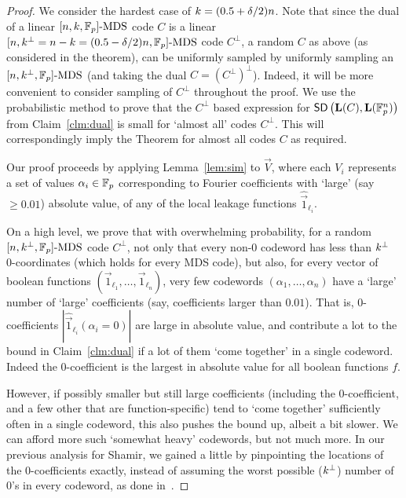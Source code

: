 \begin{proof}
We consider the hardest case of $k=(0.5 + \delta/2)n$. 
Note that since the dual of a linear $[n,k,\mathbb{F}_p]\text{-MDS}$ code $C$ is a linear $[n,k^\bot = n-k=(0.5-\delta/2)n,\mathbb{F}_p]\text{-MDS}$ code $C^\bot$, a random $C$ as above (as considered in the theorem), can be uniformly sampled by uniformly sampling an $[n,k^\bot,\mathbb{F}_p]\text{-MDS}$ (and taking the dual $C=(C^\bot)^\bot$).
Indeed, it will be more convenient to consider sampling of $C^\bot$ throughout the proof. 
We use the probabilistic method to prove that the $C^\bot$ based expression for $\mathsf{SD} \left({\mathbf{L}(C)},{\mathbf{L}(\mathbb{F}^n_p)} \right)$ from Claim~\ref{clm:dual} is small for `almost all' codes $C^\bot$. This will correspondingly imply the Theorem for almost all codes $C$ as required. 

Our proof proceeds by applying Lemma~\ref{lem:sim} to $\vec{V}$, where each $V_i$ represents a set of values $\alpha_i\in \mathbb{F}_p$ corresponding to Fourier coefficients with  `large' (say $\geq 0.01$) absolute value, of any of the local leakage functions $\widehat{\vec{1}}_{\ell_i}$. 

On a high level, we prove that with overwhelming probability, for a random $[n,k^\bot,\mathbb{F}_p]\text{-MDS}$ code $C^\bot$, not only that every non-0 codeword has less than $k^\bot$ 0-coordinates (which holds for every MDS code), but also, for every vector of boolean functions $(\vec{1}_{\ell_1},\ldots,\vec{1}_{\ell_n})$, very few codewords $(\alpha_1,\ldots,\alpha_n)$ have a `large' number of `large' coefficients (say, coefficients larger than $0.01$).
That is, 0-coefficients $|\widehat{\vec{1}}_{\ell_i}(\alpha_i=0)|$ are large in absolute value, and contribute a lot to the bound in Claim~\ref{clm:dual} if a lot of them `come together' in a single codeword. Indeed the 0-coefficient is the largest in absolute value for all boolean functions $f$. 

However, if possibly smaller but still large coefficients  (including the 0-coefficient, and a few other that are function-specific)
tend to `come together' sufficiently often in a single codeword, this also pushes the bound up, albeit a bit slower. We can afford more such `somewhat heavy' codewords, but not much more. In our previous analysis for Shamir, we gained a little by pinpointing the locations of the 0-coefficients exactly, instead of assuming the worst possible ($k^\bot$) number of 0's in every codeword, as done in~\cite{EPRINT:BDIR19}. 


\end{proof}
